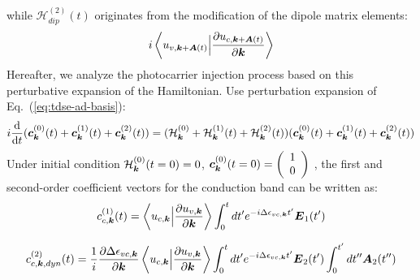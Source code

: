 while $\mathcal{H}^{(2)}_{dip}(t)$ originates from the modification of the dipole matrix elements:
\begin{align}
i\left \langle u_{v,\boldsymbol k+\boldsymbol A(t)}\Big |\frac{\partial u_{c,\boldsymbol k+\boldsymbol A(t)}}{\partial \boldsymbol k} \right \rangle    
\end{align}
Hereafter, we analyze the photocarrier injection process based on this perturbative expansion of the Hamiltonian. Use perturbation expansion of Eq.~(\ref{eq:tdse-ad-basis}):
\begin{align}
i\frac{\mathrm{d}  }{\mathrm{d} t} (\boldsymbol c^{(0)}_{\boldsymbol k}(t)+\boldsymbol c^{(1)}_{\boldsymbol k}(t)+\boldsymbol c^{(2)}_{\boldsymbol k}(t))=(\mathcal{H}^{(0)}_{\boldsymbol k}+\mathcal{H}^{(1)}_{\boldsymbol k}(t)+\mathcal{H}^{(2)}_{\boldsymbol k}(t)) (\boldsymbol c^{(0)}_{\boldsymbol k}(t)+\boldsymbol c^{(1)}_{\boldsymbol k}(t)+\boldsymbol c^{(2)}_{\boldsymbol k}(t))
\label{perturbative}
\end{align}
Under initial condition $\mathcal{H}^{(0)}_{\boldsymbol k}(t=0)=0$, $\boldsymbol c^{(0)}_{\boldsymbol k}(t=0) = \left(
    \begin{array}{cc}
      1\\
     0
    \end{array}
    \right)$ ,  the first and second-order coefficient vectors for the conduction band can be written as:
\begin{align}
     c^{(1)}_{c,\boldsymbol k}(t) = \left \langle u_{c,\boldsymbol k}\Big |\frac{\partial u_{v,\boldsymbol k}}{\partial \boldsymbol k} \right \rangle \int_0^t dt' e^{-i \Delta \epsilon_{vc,\boldsymbol k}t'} 
      \boldsymbol E_1(t') 
\label{first_P}
\end{align}

\begin{align}
     c^{(2)}_{c,\boldsymbol k,dyn}(t) = \frac{1}{i} \frac{\partial  \Delta \epsilon_{vc,\boldsymbol k}}{\partial \boldsymbol k} \left \langle u_{c,\boldsymbol k}\Big |\frac{\partial u_{v,\boldsymbol k}}{\partial \boldsymbol k} \right \rangle \int_0^t dt' e^{-i \Delta \epsilon_{vc,\boldsymbol k}t'}\boldsymbol E_2(t') \int_0^{t'}  
    dt'' \boldsymbol A_2(t'') 
    \label{second_dyn}
\end{align}

